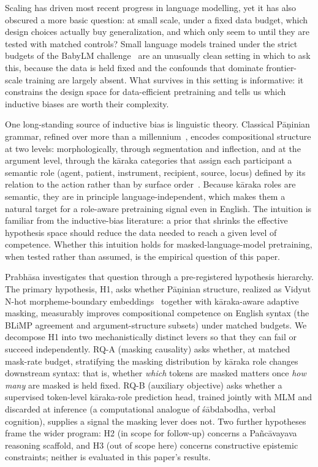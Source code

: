 
Scaling has driven most recent progress in language modelling, yet it has also obscured a more basic question: at small scale, under a fixed data budget, which design choices actually buy generalization, and which only seem to until they are tested with matched controls? Small language models trained under the strict budgets of the BabyLM challenge~\cite{Warstadt2023, Hu2024BabyLM} are an unusually clean setting in which to ask this, because the data is held fixed and the confounds that dominate frontier-scale training are largely absent. What survives in this setting is informative: it constrains the design space for data-efficient pretraining and tells us which inductive biases are worth their complexity.

One long-standing source of inductive bias is linguistic theory. Classical Pāṇinian grammar, refined over more than a millennium~\cite{Matilal1990WordWorld}, encodes compositional structure at two levels: morphologically, through segmentation and inflection, and at the argument level, through the kāraka categories that assign each participant a semantic role (agent, patient, instrument, recipient, source, locus) defined by its relation to the action rather than by surface order~\cite{KiparskyStaal1969, Cardona1974Karaka}. Because kāraka roles are semantic, they are in principle language-independent, which makes them a natural target for a role-aware pretraining signal even in English. The intuition is familiar from the inductive-bias literature: a prior that shrinks the effective hypothesis space should reduce the data needed to reach a given level of competence. Whether this intuition holds for masked-language-model pretraining, when tested rather than assumed, is the empirical question of this paper.

Prabhāsa investigates that question through a pre-registered hypothesis hierarchy. The primary hypothesis, H1, asks whether Pāṇinian structure, realized as Vidyut N-hot morpheme-boundary embeddings~\cite{Prasad2024Vidyut} together with kāraka-aware adaptive masking, measurably improves compositional competence on English syntax (the BLiMP agreement and argument-structure subsets) under matched budgets. We decompose H1 into two mechanistically distinct levers so that they can fail or succeed independently. RQ-A (masking causality) asks whether, at matched mask-rate budget, stratifying the masking distribution by kāraka role changes downstream syntax: that is, whether \emph{which} tokens are masked matters once \emph{how many} are masked is held fixed. RQ-B (auxiliary objective) asks whether a supervised token-level kāraka-role prediction head, trained jointly with MLM and discarded at inference (a computational analogue of śābdabodha, verbal cognition), supplies a signal the masking lever does not. Two further hypotheses frame the wider program: H2 (in scope for follow-up) concerns a Pañcāvayava reasoning scaffold, and H3 (out of scope here) concerns constructive epistemic constraints; neither is evaluated in this paper's results.

